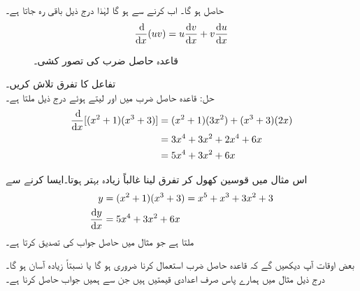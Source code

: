 حاصل ہو گا۔ اب   کرنے سے  ہو گا لہٰذا درج ذیل باقی رہ جاتا ہے۔
\begin{align*}
\frac{\dif}{\dif x}(uv)=u\frac{\dif v}{\dif x}+v\frac{\dif u}{\dif x}
\end{align*} 
%
\begin{figure}
\centering
{}
\caption{قاعدہ حاصل ضرب کی تصور کشی۔}
\label{شکل_تفرق_قاعدہ_ضرب_تصور_کشی}
\end{figure}

تفاعل  کا تفرق تلاش کریں۔\\
حل:\quad
قاعدہ حاصل ضرب میں  اور  لیتے ہوئے درج ذیل ملتا ہے۔
\begin{align*}
\frac{\dif}{\dif x}[(x^2+1)(x^3+3)]&=(x^2+1)(3x^2)+(x^3+3)(2x)\\
&=3x^4+3x^2+2x^4+6x\\
&=5x^4+3x^2+6x
\end{align*}
 
اس مثال میں  قوسین کھول کر تفرق لینا غالباً زیادہ بہتر ہوتا۔ایسا کرنے سے
\begin{align*}
y&=(x^2+1)(x^3+3)=x^5+x^3+3x^2+3\\
\frac{\dif y}{\dif x}&=5x^4+3x^2+6x
\end{align*}
ملتا ہے جو مثال  میں حاصل جواب کی تصدیق کرتا ہے۔

بعض اوقات آپ دیکھیں گے کہ قاعدہ حاصل ضرب استعمال کرنا ضروری ہو گا یا نسبتاً زیادہ آسان ہو گا۔درج ذیل مثال میں ہمارے پاس صرف اعدادی قیمتیں ہیں جن سے ہمیں جواب حاصل کرنا ہے۔

